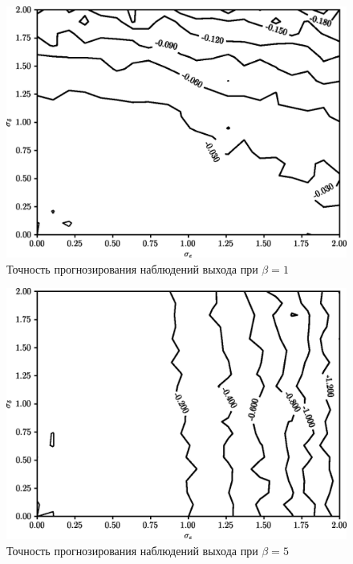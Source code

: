\begin{figure}[h]
  \centering
  \includegraphics[width=135mm]{fig/linear/predict/beta-1_predict-measured.png}
  \caption{Точность прогнозирования наблюдений выхода при \( \beta = 1\)}
\end{figure}

\begin{figure}[h]
  \centering
  \includegraphics[width=135mm]{fig/linear/predict/beta-5_predict-measured.png}
  \caption{Точность прогнозирования наблюдений выхода при \( \beta = 5 \)}
\end{figure}
